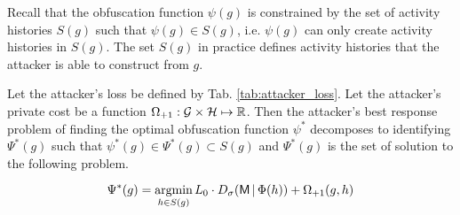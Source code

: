Recall that the obfuscation function $\psi(g)$ is constrained by the set of activity histories $S(g)$ such that $\psi(g) \in S(g)$, i.e. $\psi(g)$ can only create activity histories in $S(g)$. The set $S(g)$ in practice defines activity histories that the attacker is able to construct from $g$.

\begin{proposition}\label{prop:mal_loss}
    Let the attacker's loss be defined by Tab. \ref{tab:attacker_loss}. Let the attacker's private cost be a function $\Omega_{{\text{+}1}}: \mathcal{G} \times \mathcal{H} \mapsto \mathbb{R}$. Then the attacker's best response problem of finding the optimal obfuscation function $\psi^*$ decomposes to identifying $\Psi^*(g)$ such that $\psi^*(g) \in  \Psi^*(g) \subset S(g) $ and $\Psi^*(g)$ is the set of solution to the following problem.

    \begin{equation}
        \Psi^*(g) = \mathop{\text{argmin}}_{h \in S(g)} L_0 \cdot D_\sigma(\mathsf{M} \,|\, \Phi(h)) + \Omega_{{\text{+}1}}(g, h)
    \end{equation}

\end{proposition}

